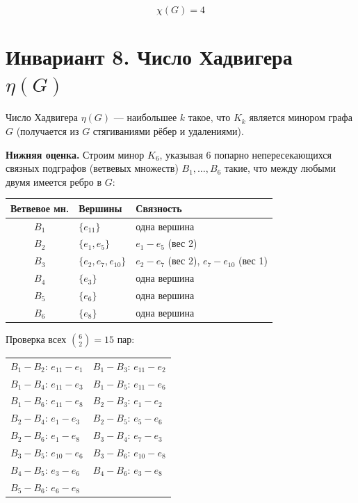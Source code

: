 \documentclass[a4paper,12pt]{article}
\begin{document}
\[
	\boxed{\chi(G) = 4}
\]

\section*{Инвариант 8. Число Хадвигера $\eta(G)$}

Число Хадвигера $\eta(G)$ --- наибольшее $k$ такое, что $K_k$ является
минором графа $G$ (получается из $G$ стягиваниями рёбер и удалениями).

\textbf{Нижняя оценка.} Строим минор $K_6$, указывая 6 попарно непересекающихся
связных подграфов (ветвевых множеств) $B_1, \ldots, B_6$ такие,
что между любыми двумя имеется ребро в $G$:

\begin{center}
	\renewcommand{\arraystretch}{1.3}
	\begin{tabular}{|c|l|l|}
		\hline
		Ветвевое мн. & Вершины                & Связность                                   \\
		\hline
		$B_1$        & $\{e_{11}\}$           & одна вершина                                \\
		$B_2$        & $\{e_1, e_5\}$         & $e_1{-}e_5$ (вес 2)                         \\
		$B_3$        & $\{e_2, e_7, e_{10}\}$ & $e_2{-}e_7$ (вес 2), $e_7{-}e_{10}$ (вес 1) \\
		$B_4$        & $\{e_3\}$              & одна вершина                                \\
		$B_5$        & $\{e_6\}$              & одна вершина                                \\
		$B_6$        & $\{e_8\}$              & одна вершина                                \\
		\hline
	\end{tabular}
\end{center}

Проверка всех $\binom{6}{2} = 15$ пар:

\begin{center}
	\renewcommand{\arraystretch}{1.2}
	\begin{tabular}{ll}
		$B_1{-}B_2$: $e_{11}{-}e_1$ \checkmark & $B_1{-}B_3$: $e_{11}{-}e_2$ \checkmark \\
		$B_1{-}B_4$: $e_{11}{-}e_3$ \checkmark & $B_1{-}B_5$: $e_{11}{-}e_6$ \checkmark \\
		$B_1{-}B_6$: $e_{11}{-}e_8$ \checkmark & $B_2{-}B_3$: $e_1{-}e_2$ \checkmark    \\
		$B_2{-}B_4$: $e_1{-}e_3$ \checkmark    & $B_2{-}B_5$: $e_5{-}e_6$ \checkmark    \\
		$B_2{-}B_6$: $e_1{-}e_8$ \checkmark    & $B_3{-}B_4$: $e_7{-}e_3$ \checkmark    \\
		$B_3{-}B_5$: $e_{10}{-}e_6$ \checkmark & $B_3{-}B_6$: $e_{10}{-}e_8$ \checkmark \\
		$B_4{-}B_5$: $e_3{-}e_6$ \checkmark    & $B_4{-}B_6$: $e_3{-}e_8$ \checkmark    \\
		$B_5{-}B_6$: $e_6{-}e_8$ \checkmark    &                                        \\
	\end{tabular}
\end{center}
\end{document}
